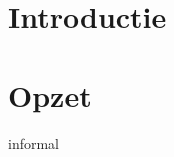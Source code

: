 \documentclass[a4paper,11pt]{article}
\begin{document}
	
	
	\tableofcontents
	\newpage

	\section{Introductie}
	
	\newpage

	\section{Opzet}
	 {informal}
\end{document}
